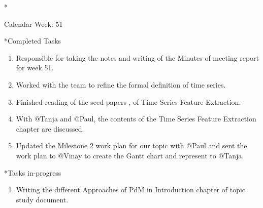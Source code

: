 \documentclass[11pt,a4paper]{article}
\begin{document}
\newpage
\begin{section}*{Calendar Week: 51 \hfill \date{18 December, 2020}}
 \begin{refsection}
     \begin{subsection}*{Completed Tasks}
         \begin{enumerate}
             \item
                   Responsible for taking the notes and writing of the Minutes of meeting report for week 51.
             \item
                   Worked with the team to refine the formal definition of time series.
             \item
                   Finished reading of the seed papers \cite{DBLP:journals/ijon/ChristBNK18}, \cite{DBLP:journals/corr/BagnallBLL16} of Time Series Feature Extraction.
             \item
                   With @Tanja and @Paul, the contents of the Time Series Feature Extraction chapter are discussed.
             \item
                   Updated the Milestone 2 work plan for our topic with @Paul and sent the work plan to @Vinay to create the Gantt chart and represent to @Tanja.
         \end{enumerate}
     \end{subsection}

     \begin{subsection}*{Tasks in-progress}
         \begin{enumerate}
             \item
                   Writing the different Approaches of PdM in Introduction chapter of topic study document.
         \end{enumerate}
     \end{subsection}

     \printbibliography
 \end{refsection}
\end{section}
\end{document}
